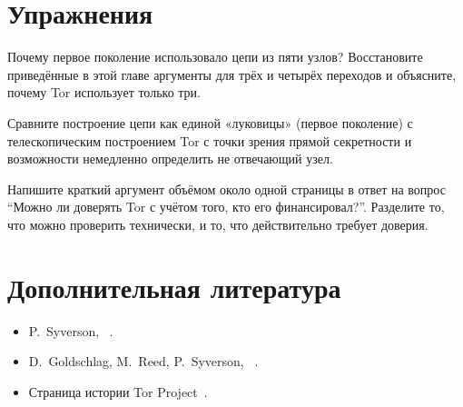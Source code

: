 \section*{Упражнения}

\begin{esercizio}[1]\label{es:03-cinque}
Почему первое поколение использовало цепи из пяти узлов? Восстановите приведённые в этой главе аргументы для трёх и четырёх переходов и объясните, почему Tor использует только три.
\end{esercizio}

\begin{esercizio}[2]\label{es:03-cipolla}
Сравните построение цепи как единой «луковицы» (первое поколение) с телескопическим построением Tor с точки зрения прямой секретности и возможности немедленно определить не отвечающий узел.
\end{esercizio}

\begin{esercizio}[2]\label{es:03-fiducia}
Напишите краткий аргумент объёмом около одной страницы в ответ на вопрос \enquote{Можно ли доверять Tor с учётом того, кто его финансировал?}. Разделите то, что можно проверить технически, и то, что действительно требует доверия.
\end{esercizio}

\section*{Дополнительная литература}
\begin{itemize}
  \item P.~Syverson, ~\cite{syverson2011peel}.
  \item D.~Goldschlag, M.~Reed, P.~Syverson, ~\cite{goldschlag1996hiding}.
  \item Страница истории Tor Project~\cite{torhistory}.
\end{itemize}
